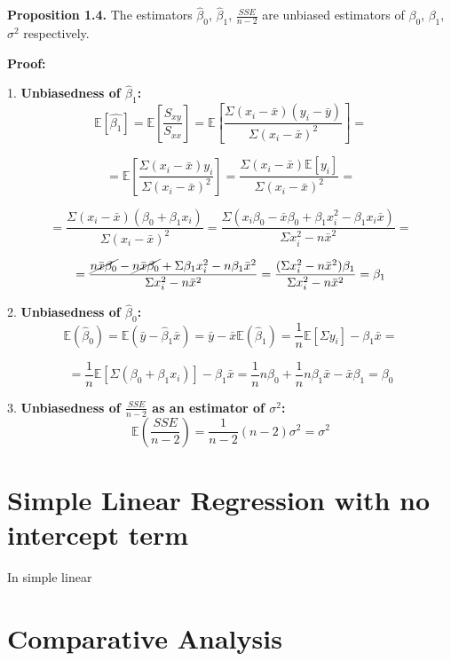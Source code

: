 \documentclass[12pt,a4paper,oneside]{book} %
\begin{document}
\textbf{Proposition 1.4.} The estimators $\hat{\beta}_0$, $\hat{\beta}_1$, $\frac{SSE}{n-2}$ are unbiased estimators of $\beta_0$, $\beta_1$, $\sigma^2$ respectively.


\textbf{Proof:}

1. \textbf{Unbiasedness of $\hat{\beta}_1$:}
\[
\mathbb{E} [ \hat{\beta _1} ] = \mathbb{E} [\frac{S_{xy}}{S_{xx}}] = \mathbb{E} [\frac{\Sigma (x_i - \bar{x})(y_i-\bar{y})}{\Sigma (x_i-\bar{x})^2}]=
\]

\[
	= \mathbb{E} [\frac{\Sigma (x_i - \bar{x})y_i}{\Sigma (x_i-\bar{x})^2}]=
	\frac{\Sigma (x_i - \bar{x})\mathbb{E} [y_i]}{\Sigma (x_i-\bar{x})^2}=
\]

\[
	= \frac{\Sigma (x_i - \bar{x})(\beta_0+\beta_1x_i)}{\Sigma (x_i-\bar{x})^2}=	
	\frac{\Sigma (x_i \beta_0 - \bar{x}\beta_0+\beta_1x_i^2-\beta_1x_i\bar{x})}{\Sigma x_i^2-n\bar{x}^2}=
\]

\[
	= \frac{\cancel{n\bar{x}\beta_0}-\cancel{n\bar{x}\beta_0}+\Sigma\beta_1x_i^2-n\beta_1\bar{x}^2}{\Sigma x_i^2-n\bar{x}^2}= \frac{(\Sigma x_i^2-n\bar{x}^2)\beta_1}{\Sigma x_i^2-n\bar{x}^2} = \beta_1
\]


2. \textbf{Unbiasedness of $\hat{\beta}_0$:}
\[
\mathbb{E}(\hat{\beta}_0) = \mathbb{E}(\bar{y} - \hat{\beta}_1 \bar{x}) = \bar{y} - \bar{x} \mathbb{E}(\hat{\beta}_1) = \frac{1}{n}\mathbb{E}[\Sigma y_i]-\beta_1 \bar{x} =
\] 

\[
	= \frac{1}{n}\mathbb{E}[\Sigma (\beta_0+\beta_1x_i)]-\beta_1 \bar{x} 
	= \frac{1}{n}n\beta_0+\frac{1}{n}n\beta_1\bar{x}-\bar{x}\beta_1=\beta_0	
\]


3. \textbf{Unbiasedness of $\frac{SSE}{n-2}$ as an estimator of $\sigma^2$:}
\[
\mathbb{E}\left(\frac{SSE}{n-2}\right) = \frac{1}{n-2} (n - 2) \sigma^2 = \sigma^2
\]




	\clearpage

	\section{Simple Linear Regression with no intercept term}

In simple linear 




	
	\clearpage

	\section{Comparative Analysis}	
	
\end{document}
